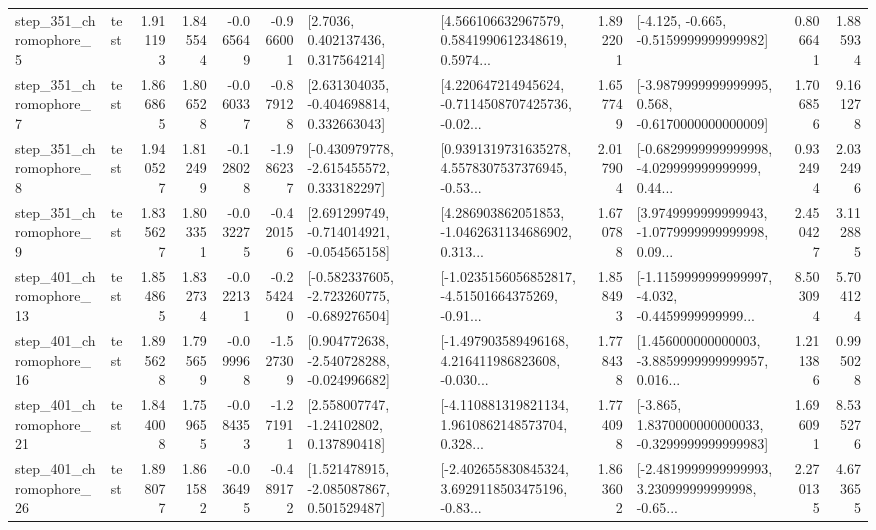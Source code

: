\begin{tabular}{llrrrrllrlrr}
   step\_351\_chromophore\_5 &      test &      1.911193 &    1.845544 &     -0.065649 & -0.966001 &          [2.7036, 0.402137436, 0.317564214] &  [4.566106632967579, 0.5841990612348619, 0.5974... &       1.892201 &              [-4.125, -0.665, -0.5159999999999982] &            0.806641 &          1.885934 \\
   step\_351\_chromophore\_7 &      test &      1.866865 &    1.806528 &     -0.060337 & -0.879128 &    [2.631304035, -0.404698814, 0.332663043] &  [4.220647214945624, -0.7114508707425736, -0.02... &       1.657749 &  [-3.9879999999999995, 0.568, -0.6170000000000009] &            1.706856 &          9.161278 \\
   step\_351\_chromophore\_8 &      test &      1.940527 &    1.812499 &     -0.128028 & -1.986237 &   [-0.430979778, -2.615455572, 0.333182297] &  [0.9391319731635278, 4.5578307537376945, -0.53... &       2.017904 &  [-0.6829999999999998, -4.029999999999999, 0.44... &            0.932494 &          2.032496 \\
   step\_351\_chromophore\_9 &      test &      1.835627 &    1.803351 &     -0.032275 & -0.420156 &   [2.691299749, -0.714014921, -0.054565158] &  [4.286903862051853, -1.0462631134686902, 0.313... &       1.670788 &  [3.9749999999999943, -1.0779999999999998, 0.09... &            2.450427 &          3.112885 \\
  step\_401\_chromophore\_13 &      test &      1.854865 &    1.832734 &     -0.022131 & -0.254240 &  [-0.582337605, -2.723260775, -0.689276504] &  [-1.0235156056852817, -4.51501664375269, -0.91... &       1.858493 &  [-1.1159999999999997, -4.032, -0.4459999999999... &            8.503094 &          5.704124 \\
  step\_401\_chromophore\_16 &      test &      1.895628 &    1.795659 &     -0.099968 & -1.527309 &   [0.904772638, -2.540728288, -0.024996682] &  [-1.497903589496168, 4.216411986823608, -0.030... &       1.778438 &  [1.456000000000003, -3.8859999999999957, 0.016... &            1.211386 &          0.995028 \\
  step\_401\_chromophore\_21 &      test &      1.844008 &    1.759655 &     -0.084353 & -1.271911 &     [2.558007747, -1.24102802, 0.137890418] &  [-4.110881319821134, 1.9610862148573704, 0.328... &       1.774098 &  [-3.865, 1.8370000000000033, -0.3299999999999983] &            1.696091 &          8.535276 \\
  step\_401\_chromophore\_26 &      test &      1.898077 &    1.861582 &     -0.036495 & -0.489172 &    [1.521478915, -2.085087867, 0.501529487] &  [-2.402655830845324, 3.6929118503475196, -0.83... &       1.863602 &  [-2.4819999999999993, 3.230999999999998, -0.65... &            2.270135 &          4.673655 \\

\end{tabular}
